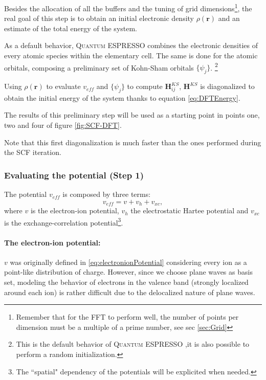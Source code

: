\documentclass[a4paper,12pt]{article}
\newcommand\mf[1]{\mathbf{#1}}
\newcommand\dens{\rho(\mathbf{r})}
\newcommand\QE{\textsc{Quantum} ESPRESSO }
\begin{document}
Besides the allocation of all the buffers and the tuning of grid dimensions\footnote{Remember that for the FFT to perform well, the number of points per dimension must be a multiple of a prime number, see sec \ref{sec:Grid}}, the real goal of this step is to obtain an initial electronic density $\dens$ and an estimate of the total energy of the system.

As a default behavior, \QE combines the electronic densities of every atomic species within the elementary cell.
The same is done for the atomic orbitals, composing a preliminary set of Kohn-Sham orbitals $\{\psi_j\}$.
\footnote{This is the default behavior of \QE ,it is also possible to perform a random initialization.}

Using $\dens$ to evaluate $v_{eff}$ and $\{\psi_j\}$ to compute $\mf{H}_{ij}^{KS}$, $\mf{H}^{KS}$ is diagonalized to obtain the initial energy of the system thanks to equation \eqref{eq:DFTEnergy}. 

The results of this preliminary step will be used as a starting point in points one, two and four of figure \ref{fig:SCF-DFT}.

Note that this first diagonalization is much faster than the ones performed during the SCF iteration.




\subsubsection{Evaluating the potential (Step 1)}\label{sec:Potential}

The potential $v_{eff}$ is composed by three terms:
\begin{equation}
	v_{eff} = v + v_{h} + v_{xc},
\end{equation}
where $v$ is the electron-ion potential, $v_{h}$ the electrostatic Hartee potential and $v_{xc}$ is the exchange-correlation potential\footnote{The ``spatial" dependency of the potentials will be explicited when needed.}.

\paragraph{The electron-ion potential:}
$v$ was originally defined in \eqref{eq:electronionPotential} considering every ion as a point-like distribution of charge. 
However, since we choose plane waves as basis set, modeling the behavior of electrons in the valence band (strongly localized around each ion) is rather difficult due to the delocalized nature of plane waves.
\end{document}
